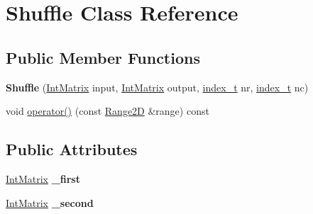 \hypertarget{class_shuffle}{
\section{Shuffle Class Reference}
\label{class_shuffle}
}
\subsection*{Public Member Functions}
\begin{CompactItemize}
\item 
\hypertarget{class_shuffle_b6e81ca9e45260ac098005caddd5a663}{
\textbf{Shuffle} (\hyperlink{cowichan_8hpp_82321152ddeeefe9c61350a42ed9e7af}{IntMatrix} input, \hyperlink{cowichan_8hpp_82321152ddeeefe9c61350a42ed9e7af}{IntMatrix} output, \hyperlink{cowichan_8hpp_5b04577d5d21124855deaad298595371}{index\_\-t} nr, \hyperlink{cowichan_8hpp_5b04577d5d21124855deaad298595371}{index\_\-t} nc)}
\label{class_shuffle_b6e81ca9e45260ac098005caddd5a663}

\item 
void \hyperlink{class_shuffle_7922aacb5aae207d2e51ded86b3c1c9d}{operator()} (const \hyperlink{cowichan__tbb_8hpp_e591b8e6980ddc5982ee22655da2ab8e}{Range2D} \&range) const 
\end{CompactItemize}
\subsection*{Public Attributes}
\begin{CompactItemize}
\item 
\hypertarget{class_shuffle_b0fed7e167e632459538da3d6e810b2e}{
\hyperlink{cowichan_8hpp_82321152ddeeefe9c61350a42ed9e7af}{IntMatrix} \textbf{\_\-first}}
\label{class_shuffle_b0fed7e167e632459538da3d6e810b2e}

\item 
\hypertarget{class_shuffle_4b6d3c7369a12163f9ad5a080a5b208e}{
\hyperlink{cowichan_8hpp_82321152ddeeefe9c61350a42ed9e7af}{IntMatrix} \textbf{\_\-second}}
\label{class_shuffle_4b6d3c7369a12163f9ad5a080a5b208e}

\end{CompactItemize}
